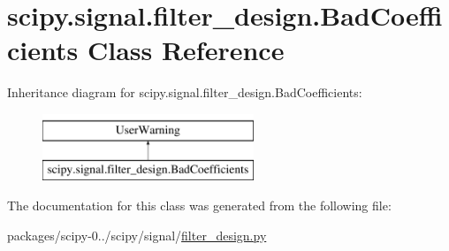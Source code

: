 \hypertarget{classscipy_1_1signal_1_1filter__design_1_1BadCoefficients}{}\section{scipy.\+signal.\+filter\+\_\+design.\+Bad\+Coefficients Class Reference}
\label{classscipy_1_1signal_1_1filter__design_1_1BadCoefficients}
Inheritance diagram for scipy.\+signal.\+filter\+\_\+design.\+Bad\+Coefficients\+:\begin{figure}[H]
\begin{center}
\leavevmode
\includegraphics[height=2.000000cm]{classscipy_1_1signal_1_1filter__design_1_1BadCoefficients}
\end{center}
\end{figure}


The documentation for this class was generated from the following file\+:\begin{DoxyCompactItemize}
\item 
packages/scipy-\/0../scipy/signal/\hyperlink{filter__design_8py}{filter\+\_\+design.\+py}\end{DoxyCompactItemize}
